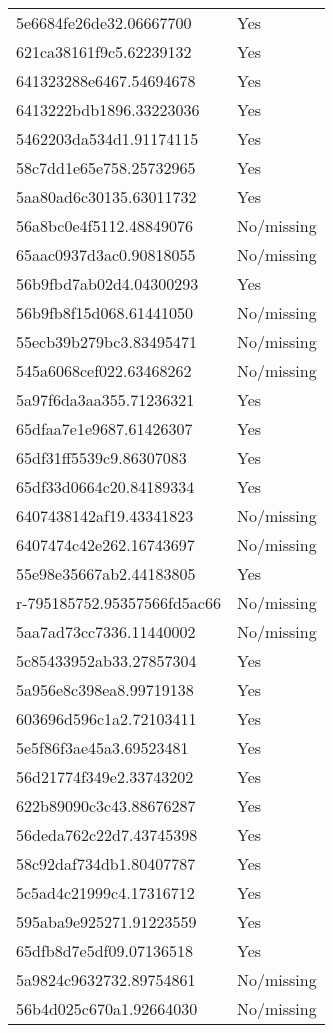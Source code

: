 \begin{tabular}{ll}
5e6684fe26de32.06667700 & Yes \\
621ca38161f9c5.62239132 & Yes \\
641323288e6467.54694678 & Yes \\
6413222bdb1896.33223036 & Yes \\
5462203da534d1.91174115 & Yes \\
58c7dd1e65e758.25732965 & Yes \\
5aa80ad6c30135.63011732 & Yes \\
56a8bc0e4f5112.48849076 & No/missing \\
65aac0937d3ac0.90818055 & No/missing \\
56b9fbd7ab02d4.04300293 & Yes \\
56b9fb8f15d068.61441050 & No/missing \\
55ecb39b279bc3.83495471 & No/missing \\
545a6068cef022.63468262 & No/missing \\
5a97f6da3aa355.71236321 & Yes \\
65dfaa7e1e9687.61426307 & Yes \\
65df31ff5539c9.86307083 & Yes \\
65df33d0664c20.84189334 & Yes \\
6407438142af19.43341823 & No/missing \\
6407474c42e262.16743697 & No/missing \\
55e98e35667ab2.44183805 & Yes \\
r-795185752.95357566fd5ac66 & No/missing \\
5aa7ad73cc7336.11440002 & No/missing \\
5c85433952ab33.27857304 & Yes \\
5a956e8c398ea8.99719138 & Yes \\
603696d596c1a2.72103411 & Yes \\
5e5f86f3ae45a3.69523481 & Yes \\
56d21774f349e2.33743202 & Yes \\
622b89090c3c43.88676287 & Yes \\
56deda762c22d7.43745398 & Yes \\
58c92daf734db1.80407787 & Yes \\
5c5ad4c21999c4.17316712 & Yes \\
595aba9e925271.91223559 & Yes \\
65dfb8d7e5df09.07136518 & Yes \\
5a9824c9632732.89754861 & No/missing \\
56b4d025c670a1.92664030 & No/missing \\

\end{tabular}
